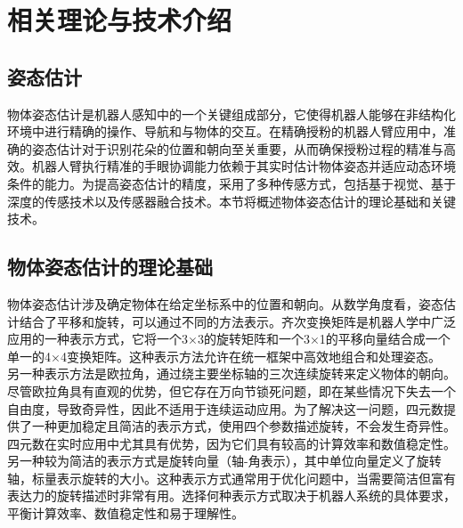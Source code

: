 \chapter{相关理论与技术介绍}\label{ch:2}
\section{姿态估计}

物体姿态估计是机器人感知中的一个关键组成部分，它使得机器人能够在非结构化环境中进行精确的操作、导航和与物体的交互。在精确授粉的机器人臂应用中，准确的姿态估计对于识别花朵的位置和朝向至关重要，从而确保授粉过程的精准与高效。机器人臂执行精准的手眼协调能力依赖于其实时估计物体姿态并适应动态环境条件的能力。为提高姿态估计的精度，采用了多种传感方式，包括基于视觉、基于深度的传感技术以及传感器融合技术。本节将概述物体姿态估计的理论基础和关键技术。

\section{物体姿态估计的理论基础}

物体姿态估计涉及确定物体在给定坐标系中的位置和朝向。从数学角度看，姿态估计结合了平移和旋转，可以通过不同的方法表示。齐次变换矩阵是机器人学中广泛应用的一种表示方式，它将一个3×3的旋转矩阵和一个3×1的平移向量结合成一个单一的4×4变换矩阵。这种表示方法允许在统一框架中高效地组合和处理姿态。
另一种表示方法是欧拉角，通过绕主要坐标轴的三次连续旋转来定义物体的朝向。尽管欧拉角具有直观的优势，但它存在万向节锁死问题，即在某些情况下失去一个自由度，导致奇异性，因此不适用于连续运动应用。为了解决这一问题，四元数提供了一种更加稳定且简洁的表示方式，使用四个参数描述旋转，不会发生奇异性。四元数在实时应用中尤其具有优势，因为它们具有较高的计算效率和数值稳定性。
另一种较为简洁的表示方式是旋转向量（轴-角表示），其中单位向量定义了旋转轴，标量表示旋转的大小。这种表示方式通常用于优化问题中，当需要简洁但富有表达力的旋转描述时非常有用。选择何种表示方式取决于机器人系统的具体要求，平衡计算效率、数值稳定性和易于理解性。


